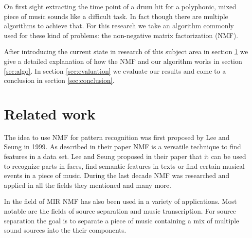 \documentclass{article}
\begin{document}
On first sight extracting the time point of a drum hit for a polyphonic, mixed piece of music sounds like a difficult task.
In fact though there are multiple algorithms to achieve that.
For this research we take an algorithm commonly used for these kind of problems: the non-negative matrix factorization (NMF).

After introducing the current state in research of this subject area in section \ref{sec:rel} we give a detailed explanation of how the NMF and our algorithm works in section \ref{sec:algo}.
In section \ref{sec:evaluation} we evaluate our results and come to a conclusion in section \ref{sec:conclusion}.






\section{Related work}
\label{sec:rel}

The idea to use NMF for pattern recognition was first proposed by Lee and Seung in 1999. \cite{lee1999}
As described in their paper NMF is a versatile technique to find features in a data set.
Lee and Seung proposed in their paper that it can be used to recognize parts in faces, find semantic features in texts or find certain musical events in a piece of music.
During the last decade NMF was researched and applied in all the fields they mentioned and many more.

In the field of MIR NMF has also been used in a variety of applications.
Most notable are the fields of source separation and music transcription.
For source separation the goal is to separate a piece of music containing a mix of multiple sound sources into the their components.
\cite{virtanen2007}
\end{document}
